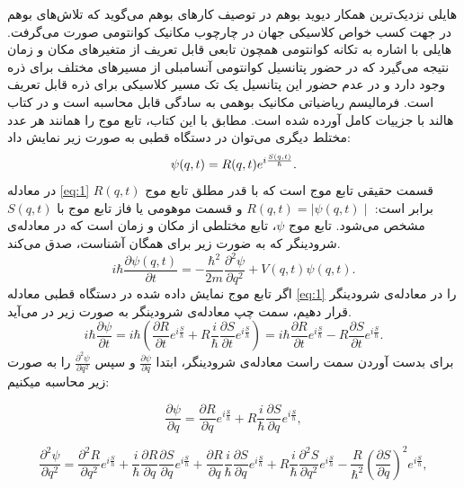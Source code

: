 \documentclass[a4paper,titlepage,12pt,fleqn,oneside]{report}
\begin{document}
هایلی 
نزدیک‌ترین همکار دیوید بوهم در توصیف کارهای بوهم می‌گوید که تلاش‌های بوهم در جهت کسب خواص کلاسیکی جهان در چارچوب مکانیک کوانتومی صورت می‌گرفت. هایلی با اشاره به تکانه کوانتومی همچون تابعی قابل تعریف از متغیرهای مکان و زمان نتیجه می‌گیرد که در حضور پتانسیل کوانتومی آنسامبلی از مسیرهای مختلف برای ذره وجود دارد و در عدم حضور این پتانسیل یک تک مسیر کلاسیکی برای ذره قابل تعریف است.  فرمالیسم ریاضیاتی مکانیک بوهمی به سادگی قابل محاسبه است و در کتاب هالند با جزییات کامل آورده شده است. مطابق با این کتاب، تابع موج را همانند هر عدد مختلط دیگری می‌توان در دستگاه قطبی به صورت زیر نمایش داد:
\begin{equation}
\centering
\psi (q,t)=R(q,t)e^{i\frac{S(q,t)}{\hbar}}.
\label{eq:1}
\end{equation}
در معادله
 \ref{eq:1} 
$R(q,t)$
قسمت حقیقی تابع موج است که با قدر مطلق تابع موج برابر است: 
$R(q,t)=\mid\psi(q,t)\mid$
و قسمت موهومی یا فاز تابع موج با 
$S(q,t)$
مشخص می‌شود.
 تابع موج $\psi$، تابع مختلطی از مکان و زمان است که در معادله‌ی شرودینگر که به ضورت زیر برای همگان آشناست، صدق می‌کند. 
\begin{equation}
i \hbar \frac{\partial\psi(q,t)}{\partial t} =-\frac{\hbar^2}{2m}\frac{\partial^2\psi}{\partial q^2}+V(q,t)\psi(q,t) .
\label{eq:2}
\end{equation}
اگر تابع موج نمایش داده شده در دستگاه قطبی معادله
‌\ref{eq:1}
را در معادله‌ی شرودینگر قرار ‌دهیم، سمت چپ معادله‌ی شرودینگر به صورت زیر در می‌آيد. 
\begin{equation}
	i\hbar \frac{\partial \psi}{\partial t}=i\hbar\left(\frac{\partial R}{\partial t} e^{i\frac{S}{h}} +R\frac{i}{\hbar}\frac{\partial S}{\partial t} e^{i\frac{S}{h}} \right)
	=i\hbar\frac{\partial R}{\partial t}e^{i \frac{S}{\hbar}}-R\frac{\partial S}{\partial t}e^{i \frac{S}{\hbar}}.
\end{equation}
برای بدست آوردن سمت راست معادله‌ی شرودینگر، ابتدا $\frac{\partial\psi}{\partial q}$ و سپس  $\frac{\partial^2\psi}{\partial q^2}$ را به صورت  زیر محاسبه میکنیم:

\begin{equation}
\frac{\partial \psi}{\partial q}=\frac{\partial R}{\partial q} e^{i\frac{S}{h}} +R\frac{i}{\hbar}\frac{\partial S}{\partial q} e^{i\frac{S}{h}} ,
\end{equation}

\begin{equation}
\frac{\partial^2 \psi}{\partial q^2}=\frac{\partial^2 R}{\partial q^2} e^{i\frac{S}{h}}+
\frac{i}{\hbar}\frac{\partial R}{\partial q}\frac{\partial S}{\partial q} e^{i\frac{S}{h}}+
\frac{\partial R}{\partial q}\frac{i}{\hbar}\frac{\partial S}{\partial q} e^{i\frac{S}{h}}+
R\frac{i}{\hbar}\frac{\partial^2 S}{\partial q^2} e^{i\frac{S}{h}}-\frac{R}{\hbar^2}\left(\frac{\partial S}{\partial q}\right)^2 e^{i\frac{S}{h}},
\end{equation}
\end{document}

